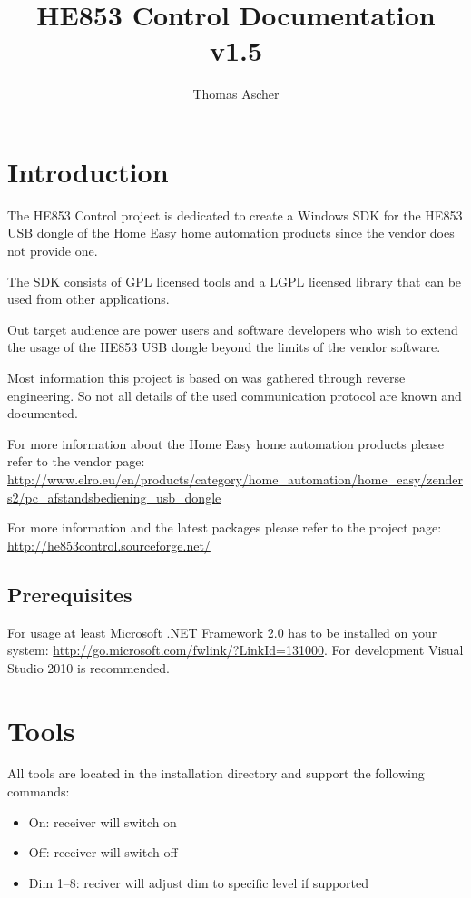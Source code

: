 \documentclass[
a4paper,
oneside,
halfparskip*,
normalheadings,
]
{scrbook}
\begin{document}
\title{HE853 Control Documentation v1.5}
\author{Thomas Ascher}
\maketitle
\tableofcontents
\mainmatter

\chapter{Introduction}

The HE853 Control project is dedicated to create a Windows SDK for the HE853 USB
dongle of the Home Easy home automation products since the vendor does not provide
one.

The SDK consists of GPL licensed tools and a LGPL licensed library that can be
used from other applications.

Out target audience are power users and software developers who wish to extend the
usage of the HE853 USB dongle beyond the limits of the vendor software.

Most information this project is based on was gathered through reverse engineering.
So not all details of the used communication protocol are known and documented.

For more information about the Home Easy home automation products please refer to
the vendor page: \url{http://www.elro.eu/en/products/category/home_automation/home_easy/zenders2/pc_afstandsbediening_usb_dongle}

For more information and the latest packages please refer to the project page:
\url{http://he853control.sourceforge.net/}

\section{Prerequisites}
For usage at least Microsoft .NET Framework 2.0 has to be installed on your
system: \url{http://go.microsoft.com/fwlink/?LinkId=131000}. For development
Visual Studio 2010 is recommended.




\chapter{Tools}

All tools are located in the installation directory and support the following commands:

\begin{itemize}
	\item On: receiver will switch on
	\item Off: receiver will switch off
	\item Dim 1--8: reciver will adjust dim to specific level if supported
\end{itemize}
\end{document}
